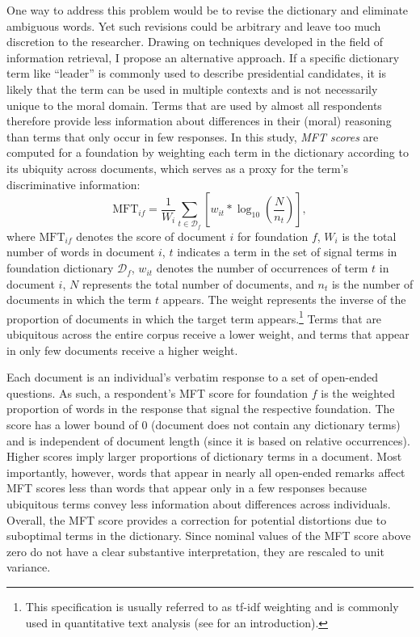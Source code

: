 One way to address this problem would be to revise the dictionary and eliminate ambiguous words. Yet such revisions could be arbitrary and leave too much discretion to the researcher. Drawing on techniques developed in the field of information retrieval, I propose an alternative approach. If a specific dictionary term like ``leader'' is commonly used to describe presidential candidates, it is likely that the term can be used in multiple contexts and is not necessarily unique to the moral domain. Terms that are used by almost all respondents therefore provide less information about differences in their (moral) reasoning than terms that only occur in few responses. In this study, \textit{MFT scores} are computed for a foundation by weighting each term in the dictionary according to its ubiquity across documents, which serves as a proxy for the term's discriminative information:
\begin{equation}\label{eq:tfidf}
\text{MFT}_{if} = \dfrac{1}{W_i} \sum_{t \in \mathcal{D}_f} \left[ w_{it} * \log_{10}\left( \dfrac{N}{n_t}\right) \right],
\end{equation}
where $\text{MFT}_{if}$ denotes the score of document $i$ for foundation $f$, $W_i$ is the total number of words in document $i$, $t$ indicates a term in the set of signal terms in foundation dictionary $\mathcal{D}_f$, $w_{it}$ denotes the number of occurrences of term $t$ in document $i$, $N$ represents the total number of documents, and $n_t$ is the number of documents in which the term $t$ appears. The weight represents the inverse of the proportion of documents in which the target term appears.\footnote{This specification is usually referred to as tf-idf weighting and is commonly used in quantitative text analysis (see \citealt[ch. 6]{manning2008introduction} for an introduction).} Terms that are ubiquitous across the entire corpus receive a lower weight, and terms that appear in only few documents receive a higher weight.

Each document is an individual's verbatim response to a set of open-ended questions. As such, a respondent's MFT score for foundation $f$ is the weighted proportion of words in the response that signal the respective foundation. The score has a lower bound of 0 (document does not contain any dictionary terms) and is independent of document length (since it is based on relative occurrences). Higher scores imply larger proportions of dictionary terms in a document. Most importantly, however, words that appear in nearly all open-ended remarks affect MFT scores less than words that appear only in a few responses because ubiquitous terms convey less information about differences across individuals. Overall, the MFT score provides a correction for potential distortions due to suboptimal terms in the dictionary. Since nominal values of the MFT score above zero do not have a clear substantive interpretation, they are rescaled to unit variance.


